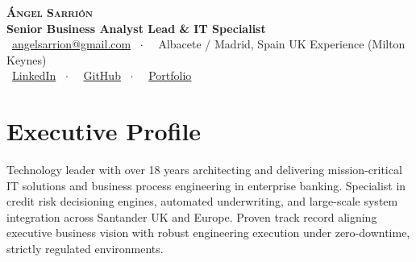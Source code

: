 \documentclass[10pt,a4paper]{article}
\begin{document}
\pagestyle{empty}

\begin{center}
    {\Huge\textbf{\scshape Ángel Sarrión}} \\[4pt]
    {\large\color{SynthBlue}\textbf{Senior Business Analyst Lead \& IT Specialist}} \\[6pt]
    {\small
        \faEnvelope~\href{mailto:angelsarrion@gmail.com}{angelsarrion@gmail.com} \ $\cdot$ \ 
        \faMapMarker*~{Albacete / Madrid, Spain \textbullet{} UK Experience (Milton Keynes)} \\[3pt]
        \faLinkedin~\href{https://www.linkedin.com/in/angelsarrion}{LinkedIn} \ $\cdot$ \ 
        \faGithub~\href{https://github.com/angelsarrion}{GitHub} \ $\cdot$ \ 
        \faGlobe~\href{https://angelsarrion.github.io/ASCV/}{Portfolio}
    }
\end{center}

\vspace{-4pt}

\section{Executive Profile}
\noindent Technology leader with over 18 years architecting and delivering mission-critical IT solutions and business process engineering in enterprise banking. Specialist in credit risk decisioning engines, automated underwriting, and large-scale system integration across Santander UK and Europe. Proven track record aligning executive business vision with robust engineering execution under zero-downtime, strictly regulated environments.

\end{document}
